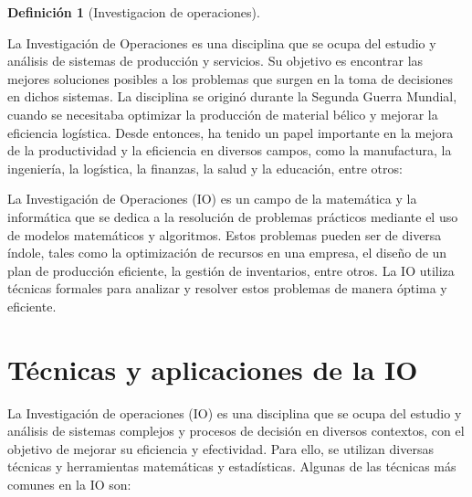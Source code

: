 \documentclass[
  letterpaper,
  DIV=11,
  numbers=noendperiod]{scrreprt}
\theoremstyle{definition}
\theoremstyle{definition}
\newtheorem{definition}{Definición}[chapter]
\theoremstyle{remark}
\begin{document}
\leavevmode{}%
\begin{definition}[Investigacion de operaciones]\label{def-io}

La Investigación de Operaciones es una disciplina que se ocupa del
estudio y análisis de sistemas de producción y servicios. Su objetivo es
encontrar las mejores soluciones posibles a los problemas que surgen en
la toma de decisiones en dichos sistemas. La disciplina se originó
durante la Segunda Guerra Mundial, cuando se necesitaba optimizar la
producción de material bélico y mejorar la eficiencia logística. Desde
entonces, ha tenido un papel importante en la mejora de la productividad
y la eficiencia en diversos campos, como la manufactura, la ingeniería,
la logística, la finanzas, la salud y la educación, entre otros:

\end{definition}

La Investigación de Operaciones (IO) es un campo de la matemática y la
informática que se dedica a la resolución de problemas prácticos
mediante el uso de modelos matemáticos y algoritmos. Estos problemas
pueden ser de diversa índole, tales como la optimización de recursos en
una empresa, el diseño de un plan de producción eficiente, la gestión de
inventarios, entre otros. La IO utiliza técnicas formales para analizar
y resolver estos problemas de manera óptima y eficiente.

\hypertarget{tuxe9cnicas-y-aplicaciones-de-la-io}{%
\section{Técnicas y aplicaciones de la
IO}\label{tuxe9cnicas-y-aplicaciones-de-la-io}}

La Investigación de operaciones (IO) es una disciplina que se ocupa del
estudio y análisis de sistemas complejos y procesos de decisión en
diversos contextos, con el objetivo de mejorar su eficiencia y
efectividad. Para ello, se utilizan diversas técnicas y herramientas
matemáticas y estadísticas. Algunas de las técnicas más comunes en la IO
son:
\end{document}
